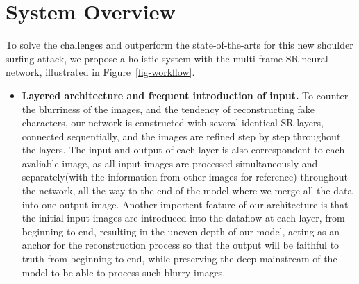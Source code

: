 \section{System Overview}
\label{sec-system-overview} 
To solve the challenges and outperform the state-of-the-arts for this new shoulder surfing attack, we propose a holistic system with the multi-frame SR neural network, illustrated in Figure~\ref{fig-workflow}.

\begin{itemize}[leftmargin=*]
  \item \textbf{Layered architecture and frequent introduction of input.} To counter the blurriness of the images, and the tendency of reconstructing fake characters, our network is constructed with several identical SR layers, connected sequentially, and the images are refined step by step throughout the layers. The input and output of each layer is also correspondent to each avaliable image, as all input images are processed simultaneously and separately(with the information from other images for reference) throughout the network, all the way to the end of the model where we merge all the data into one output image. Another importent feature of our architecture is that the initial input images are introduced into the dataflow at each layer, from beginning to end, resulting in the uneven depth of our model, acting as an anchor for the reconstruction process so that the output will be faithful to truth from beginning to end, while preserving the deep mainstream of the model to be able to process such blurry images.

\end{itemize}
